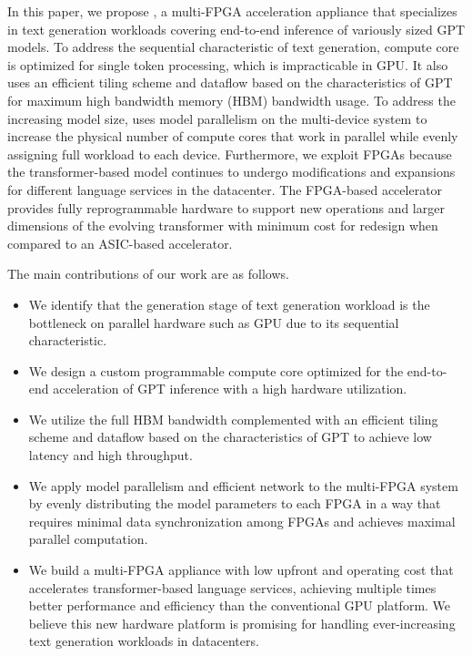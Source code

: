 In this paper, we propose \sysname, a multi-FPGA acceleration appliance that specializes in text generation workloads covering end-to-end inference of variously sized GPT models. To address the sequential characteristic of text generation, \sysname{} compute core is optimized for single token processing, which is impracticable in GPU. It also uses an efficient tiling scheme and dataflow based on the characteristics of GPT for maximum high bandwidth memory (HBM) \cite{lee201425} bandwidth usage. To address the increasing model size, \sysname{} uses model parallelism on the multi-device system to increase the physical number of compute cores that work in parallel while evenly assigning full workload to each device. Furthermore, we exploit FPGAs because the transformer-based model continues to undergo modifications and expansions for different language services in the datacenter. The FPGA-based accelerator provides fully reprogrammable hardware to support new operations and larger dimensions of the evolving transformer with minimum cost for redesign when compared to an ASIC-based accelerator.

The main contributions of our work are as follows.


\begin{itemize}[leftmargin=*]
\setlength\itemsep{0.01in}
\item {We identify that the generation stage of text generation workload is the bottleneck on parallel hardware such as GPU due to its sequential characteristic.}
\item {We design a custom programmable compute core optimized for the end-to-end acceleration of GPT inference with a high hardware utilization.}
\item {We utilize the full HBM bandwidth complemented with an efficient tiling scheme and dataflow based on the characteristics of GPT to achieve low latency and high throughput.}
\item{We apply model parallelism and efficient network to the multi-FPGA system by evenly distributing the model parameters to each FPGA in a way that requires minimal data synchronization among FPGAs and achieves maximal parallel computation.}
\item {We build a multi-FPGA appliance with low upfront and operating cost that accelerates transformer-based language services, achieving multiple times better performance and efficiency than the conventional GPU platform. We believe this new hardware platform is promising for handling ever-increasing text generation workloads in datacenters.}
\end{itemize}
